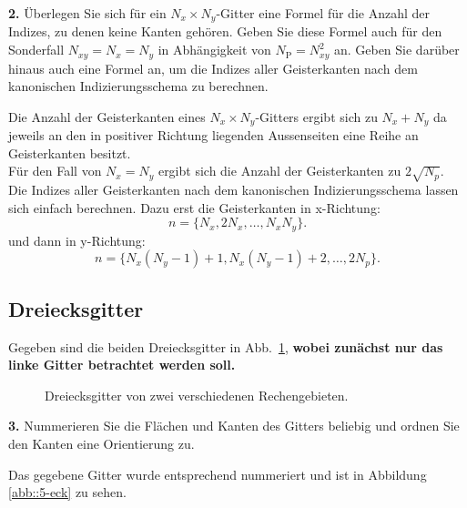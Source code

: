 \documentclass[Protokollheft.tex]{subfiles}
\begin{document}
        \begin{framed}
	\noindent \textbf{2.} \label{vorb:formel} Überlegen Sie sich für ein $N_x\times N_y$-Gitter eine Formel für die
        Anzahl der Indizes, zu denen keine Kanten gehören. Geben Sie diese Formel auch für den Sonderfall
        $N_{xy}=N_x=N_y$ in Abhängigkeit von $N_{\text{P}}=N_{xy}^2$ an. Geben Sie darüber hinaus auch eine Formel an, um die Indizes aller Geisterkanten nach dem kanonischen Indizierungsschema zu berechnen.\label{exer:nrOfGhostEdges}
\end{framed}
\noindent
Die Anzahl der Geisterkanten eines $N_x \times N_y$-Gitters ergibt sich zu $N_x + N_y$ da jeweils an den in positiver Richtung liegenden Aussenseiten eine Reihe an Geisterkanten besitzt.\\
Für den Fall von $N_x = N_y$ ergibt sich die Anzahl der Geisterkanten zu $2\sqrt{N_p}$. Die Indizes aller Geisterkanten nach dem kanonischen Indizierungsschema lassen sich einfach berechnen. Dazu erst die Geisterkanten in x-Richtung:
\begin{equation*}
	n=\{N_x,2N_x,\dots,N_xN_y\}.
\end{equation*}
und dann in y-Richtung:
\begin{equation*}
n=\{N_x(N_y-1)+1,N_x(N_y-1)+2,\dots,2N_p\}.
\end{equation*}
%
    {\subsection{Dreiecksgitter}}
    Gegeben sind die beiden Dreiecksgitter in Abb.~\ref{fig:tetmesh}, \textbf{wobei
    zunächst nur das linke Gitter betrachtet werden soll.}
  \begin{figure}[htb]
    \centering
    \begin{subfigure}{0.49\textwidth}
        \centering
                    
    \end{subfigure}
    \begin{subfigure}{0.49\textwidth}
        \centering
        
    \end{subfigure}
    \caption{Dreiecksgitter von zwei verschiedenen Rechengebieten.}
    \label{fig:tetmesh}
  \end{figure}

        \begin{framed}
	\noindent \textbf{3.} Nummerieren Sie die Flächen und Kanten des Gitters beliebig und ordnen
                    Sie den Kanten eine Orientierung zu.\label{exer:triangleOrderedNumbering}
\end{framed}
\noindent
Das gegebene Gitter wurde entsprechend nummeriert und ist in Abbildung \ref{abb::5-eck} zu sehen.
\end{document}

